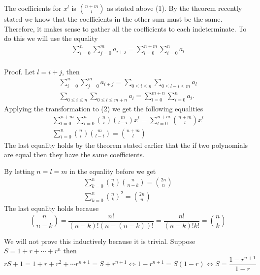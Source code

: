 \begin{problem}
{	The coefficients for $x^l$ is $\binom{n+m}{l}$ as stated above (1). By the theorem recently stated we know that the coefficients in the other sum must be the same. Therefore, it makes sense to gather all the coefficients to each indeterminate. To do this we will use the equality 
\begin{gather*}
	\sum_{i=0}^{n}\sum_{j=0}^{m}a_{i+j}=\sum_{l=0}^{n+m}\sum_{i=0}^{n}a_l \tag*{where $l=i+k$}
\end{gather*}
	\\
	Proof. Let $l=i+j$, then
	\begin{gather*}
		\sum_{i=0}^{n}\sum_{j=0}^{m}a_{i+j}=\sum_{0 \leq i \leq n}\sum_{0 \leq l-i \leq m}a_l \tag*{(Substitute $j=l-i$)} \\
		\sum_{0 \leq i \leq n}\sum_{0 \leq l \leq m+n}a_l=\sum_{l=0}^{m+n}\sum_{i=0}^{n}a_l \tag*{(Add $0\leq i \leq n$ to the left bound)}.
	\end{gather*}
	Applying the transformation to (2) we get the following equalities
	\begin{gather*}
		\sum_{l=0}^{n+m}\sum_{i=0}^{n}\binom{n}{i}\binom{m}{l-i}x^l=\sum_{l=0}^{n+m}\binom{n+m}{l}x^l \\
		\sum_{i=0}^{n}\binom{n}{i}\binom{m}{l-i}=\binom{n+m}{l}
	\end{gather*}
	The last equality holds by the theorem stated earlier that the if two polynomials are equal then they have the same coefficients.
	\item By letting $n=l=m$ in the equality before we get 
	\begin{gather*}
		\sum_{k=0}^{n}\binom{n}{k}\binom{n}{n-k}=\binom{2n}{n} \\
		\sum_{k=0}^{n}\binom{n}{k}^2=\binom{2n}{n}
	\end{gather*}
	The last equality holds because
	$$\binom{n}{n-k}=\frac{n!}{(n-k)!(n-(n-k))!}=\frac{n!}{(n-k)!k!}=\binom{n}{k}$$
	}
\end{problem}

\begin{problem}
	We will not prove this inductively because it is trivial. Suppose $S=1+r+\cdots+r^n$ then $$rS+1=1+r+r^2+\cdots r^{n+1}=S+r^{n+1} \iff 1-r^{n+1}=S(1-r) \iff S=\frac{1-r^{n+1}}{1-r}$$
\end{problem}

